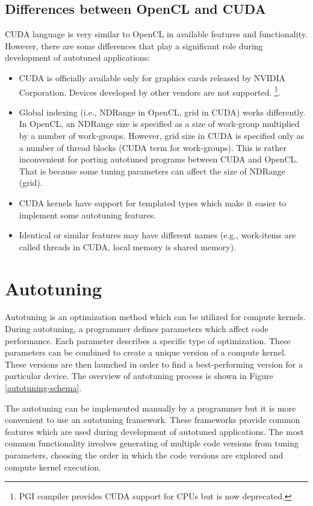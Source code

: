 \documentclass[
  digital,     %
  oneside,     %
  nosansbold,  %
  nocolorbold, %
  lof,         %
  lot,         %
  nocover
]{fithesis4}
\begin{document}
\subsection{Differences between OpenCL and CUDA}
CUDA language is very similar to OpenCL in available features and functionality. However, there are some differences that play a significant role during development of autotuned applications:
\begin{itemize}
	\item CUDA is officially available only for graphics cards released by NVIDIA Corporation. Devices developed by other vendors are not supported. \footnote{PGI compiler provides CUDA support for CPUs but is now deprecated.}.
	\item Global indexing (i.e., NDRange in OpenCL, grid in CUDA) works differently. In OpenCL, an NDRange size is specified as a size of work-group multiplied by a number of work-groups. However, grid size in CUDA is specified only as a number of thread blocks (CUDA term for work-groups). This is rather inconvenient for porting autotuned programs between CUDA and OpenCL. That is because some tuning parameters can affect the size of NDRange (grid).
	\item CUDA kernels have support for templated types which make it easier to implement some autotuning features.
	\item Identical or similar features may have different names (e.g., work-items are called threads in CUDA, local memory is shared memory).
\end{itemize}

\section{Autotuning}
Autotuning is an optimization method which can be utilized for compute kernels. During autotuning, a programmer defines parameters which affect code performance. Each parameter describes a specific type of optimization. These parameters can be combined to create a unique version of a compute kernel. These versions are then launched in order to find a best-performing version for a particular device. The overview of autotuning process is shown in Figure \ref{autotuning-schema}.

The autotuning can be implemented manually by a programmer but it is more convenient to use an autotuning framework. These frameworks provide common features which are used during development of autotuned applications. The most common functionality involves generating of multiple code versions from tuning parameters, choosing the order in which the code versions are explored and compute kernel execution.
\end{document}
